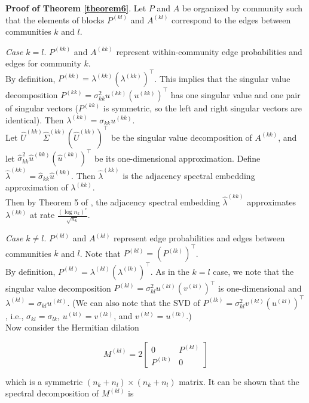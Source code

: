 \documentclass[
  12pt,
]{article}
\begin{document}
\textbf{Proof of Theorem \ref{theorem6}}. Let \(P\) and \(A\) be
organized by community such that the elements of blocks \(P^{(kl)}\) and
\(A^{(kl)}\) correspond to the edges between communities \(k\) and
\(l\).

\emph{Case \(k = l\)}. \(P^{(kk)}\) and \(A^{(kk)}\) represent
within-community edge probabilities and edges for community \(k\).\\
By definition, \(P^{(kk)} = \lambda^{(kk)} (\lambda^{(kk)})^\top\). This
implies that the singular value decomposition
\(P^{(kk)} = \sigma_{kk}^2 u^{(kk)} (u^{(kk)})^\top\) has one singular
value and one pair of singular vectors (\(P^{(kk)}\) is symmetric, so
the left and right singular vectors are identical). Then
\(\lambda^{(kk)} = \sigma_{kk} u^{(kk)}\).\\
Let \(\hat{U}^{(kk)} \hat{\Sigma}^{(kk)} (\hat{U}^{(kk)})^\top\) be the
singular value decomposition of \(A^{(kk)}\), and let
\(\hat{\sigma}_{kk}^2 \hat{u}^{(kk)} (\hat{u}^{(kk)})^\top\) be its
one-dimensional approximation. Define
\(\hat{\lambda}^{(kk)} = \hat{\sigma}_{kk} \hat{u}^{(kk)}\). Then
\(\hat{\lambda}^{(kk)}\) is the adjacency spectral embedding
approximation of \(\lambda^{(kk)}\).\\
Then by Theorem 5 of \citeauthor{rubindelanchy2017statistical}, the
adjacency spectral embedding \(\hat{\lambda}^{(kk)}\) approximates
\(\lambda^{(kk)}\) at rate \(\frac{(\log n_k)^c}{\sqrt{n_k}}\).

\emph{Case \(k \neq l\)}. \(P^{(kl)}\) and \(A^{(kl)}\) represent edge
probabilities and edges between communities \(k\) and \(l\). Note that
\(P^{(kl)} = (P^{(lk)})^\top\).\\
By definition, \(P^{(kl)} = \lambda^{(kl)} (\lambda^{(lk)})^\top\). As
in the \(k = l\) case, we note that the singular value decomposition
\(P^{(kl)} = \sigma_{kl}^2 u^{(kl)} (v^{(kl)})^\top\) is one-dimensional
and \(\lambda^{(kl)} = \sigma_{kl} u^{(kl)}\). (We can also note that
the SVD of \(P^{(lk)} = \sigma_{kl}^2 v^{(kl)} (u^{(kl)})^\top\), i.e.,
\(\sigma_{kl} = \sigma_{lk}\), \(u^{(kl)} = v^{(lk)}\), and
\(v^{(kl)} = u^{(lk)}\).)\\
Now consider the Hermitian dilation

\[M^{(kl)} = 2 \begin{bmatrix} 0 & P^{(kl)} \\ P^{(lk)} & 0 \end{bmatrix}\]

which is a symmetric \((n_k + n_l) \times (n_k + n_l)\) matrix. It can
be shown that the spectral decomposition of \(M^{(kl)}\) is
\end{document}
